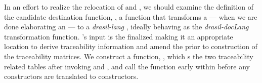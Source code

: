 In an effort to realize the relocation of  and \linebreak{}, we should examine the definition of the candidate destination function, , a function that transforms a  --- when we are done elaborating an  --- to a \textit{drasil-lang} , ideally behaving as the \textit{drasil-docLang} transformation function. 's input is the finalized  making it an appropriate location to derive traceability information and amend the  prior to construction of the traceability matrices. We construct a function, , which s the two traceability related tables after invoking  and , and call the function early within  before any  constructors are translated to  constructors.



%
%

